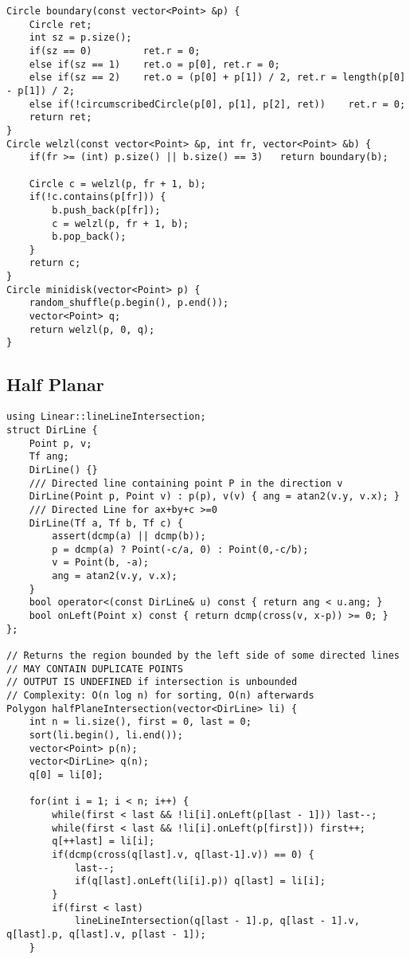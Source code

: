 \documentclass[FSZ,a4paper,onesided]{article}
\begin{document}
\begin{multicols*}{\COLS}
\begin{lstlisting}
Circle boundary(const vector<Point> &p) {
    Circle ret;
    int sz = p.size();
    if(sz == 0)         ret.r = 0;
    else if(sz == 1)    ret.o = p[0], ret.r = 0;
    else if(sz == 2)    ret.o = (p[0] + p[1]) / 2, ret.r = length(p[0] - p[1]) / 2;
    else if(!circumscribedCircle(p[0], p[1], p[2], ret))    ret.r = 0;
    return ret;
}
Circle welzl(const vector<Point> &p, int fr, vector<Point> &b) {
    if(fr >= (int) p.size() || b.size() == 3)   return boundary(b);

    Circle c = welzl(p, fr + 1, b);
    if(!c.contains(p[fr])) {
        b.push_back(p[fr]);
        c = welzl(p, fr + 1, b);
        b.pop_back();
    }
    return c;
}
Circle minidisk(vector<Point> p) {
    random_shuffle(p.begin(), p.end());
    vector<Point> q;
    return welzl(p, 0, q);
}\end{lstlisting}
\subsection{Half Planar}
\begin{lstlisting}
using Linear::lineLineIntersection;
struct DirLine {
    Point p, v;
    Tf ang;
    DirLine() {}
    /// Directed line containing point P in the direction v
    DirLine(Point p, Point v) : p(p), v(v) { ang = atan2(v.y, v.x); }
    /// Directed Line for ax+by+c >=0
    DirLine(Tf a, Tf b, Tf c) {
        assert(dcmp(a) || dcmp(b));
        p = dcmp(a) ? Point(-c/a, 0) : Point(0,-c/b);
        v = Point(b, -a);
        ang = atan2(v.y, v.x);
    }
    bool operator<(const DirLine& u) const { return ang < u.ang; }
    bool onLeft(Point x) const { return dcmp(cross(v, x-p)) >= 0; }
};

// Returns the region bounded by the left side of some directed lines
// MAY CONTAIN DUPLICATE POINTS
// OUTPUT IS UNDEFINED if intersection is unbounded
// Complexity: O(n log n) for sorting, O(n) afterwards
Polygon halfPlaneIntersection(vector<DirLine> li) {
    int n = li.size(), first = 0, last = 0;
    sort(li.begin(), li.end());
    vector<Point> p(n);
    vector<DirLine> q(n);
    q[0] = li[0];

    for(int i = 1; i < n; i++) {
        while(first < last && !li[i].onLeft(p[last - 1])) last--;
        while(first < last && !li[i].onLeft(p[first])) first++;
        q[++last] = li[i];
        if(dcmp(cross(q[last].v, q[last-1].v)) == 0) {
            last--;
            if(q[last].onLeft(li[i].p)) q[last] = li[i];
        }
        if(first < last)
            lineLineIntersection(q[last - 1].p, q[last - 1].v, q[last].p, q[last].v, p[last - 1]);
    }


\end{lstlisting}
\end{multicols*}
\end{document}
